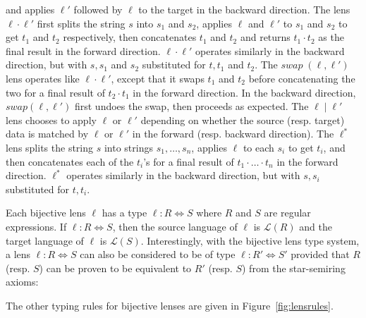 \documentclass[acmsmall,review,anonymous]{acmart}
\begin{document}
and applies $\ell'$ followed by $\ell$ to the target in the backward direction.
The lens $\ell \cdot \ell'$ first splits the string $s$ into $s_1$ and $s_2$,
applies $\ell$ and $\ell'$ to $s_1$ and $s_2$ to get $t_1$ and $t_2$
respectively, then concatenates $t_1$ and $t_2$ and returns $t_1 \cdot t_2$ as
the final result in the forward direction. $\ell \cdot \ell'$ operates
similarly in the backward direction, but with $s, s_1$ and $s_2$ substituted
for $t, t_1$ and $t_2$. The $\mathit{swap} \; (\ell, \ell')$ lens operates
like $\ell \cdot \ell'$, except that it swaps $t_1$ and $t_2$ before
concatenating the two for a final result of $t_2 \cdot t_1$ in the forward
direction. In the backward direction, $\mathit{swap}(\ell, \ell')$ first undoes
the swap, then proceeds as expected. The $\ell \; | \; \ell'$ lens
chooses to apply $\ell$ or $\ell'$ depending on whether the source
(resp. target) data is matched by $\ell$ or $\ell'$ in the forward (resp.
backward direction). The $\ell^*$ lens splits the string $s$ into strings $s_1,
\ldots, s_n$, applies $\ell$ to each $s_i$ to get $t_i$, and then concatenates
each of the $t_i$'s for a final result of $t_1 \cdot \ldots \cdot t_n$ in the
forward direction. $\ell^*$ operates similarly in the backward direction, but
with $s, s_i$ substituted for $t, t_i$.

Each bijective lens $\ell$ has a type $\ell : R \Leftrightarrow S$ where $R$ and
$S$ are regular expressions. If $\ell : R \Leftrightarrow S$, then the source
language of $\ell$ is $\mathcal{L}(R)$ and the target language of $\ell$ is
$\mathcal{L}(S)$. Interestingly, with the bijective lens type system, a lens
$\ell : R \Leftrightarrow S$ can also be considered to be of type $\ell : R'
\Leftrightarrow S'$ provided that $R$ (resp. $S$) can be proven to be
equivalent to $R'$ (resp. $S$) from the star-semiring axioms:

\begin{prooftree}
\end{prooftree}

The other typing rules for bijective lenses are given in
Figure~\ref{fig:lensrules}.
\end{document}
